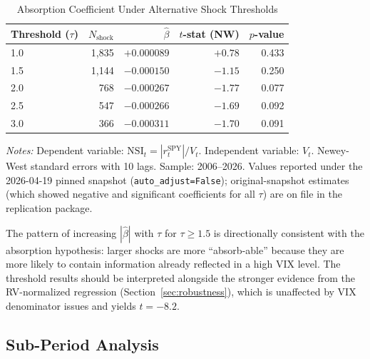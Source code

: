 \documentclass[12pt,a4paper]{article}
\begin{document}
\begin{table}[H]
\centering
\caption{Absorption Coefficient Under Alternative Shock Thresholds}
\label{tab:robust_threshold}
\begin{threeparttable}
\begin{tabular}{lrrrr}
\toprule
Threshold ($\tau$) & $N_{\text{shock}}$ & $\hat{\beta}$ & $t$-stat (NW) & $p$-value \\
\midrule
1.0 & 1,835 & $+0.000089$ & $+0.78$ & 0.433 \\
1.5 & 1,144 & $-0.000150$ & $-1.15$ & 0.250 \\
2.0 &   768 & $-0.000267$ & $-1.77$ & 0.077 \\
2.5 &   547 & $-0.000266$ & $-1.69$ & 0.092 \\
3.0 &   366 & $-0.000311$ & $-1.70$ & 0.091 \\
\bottomrule
\end{tabular}
\begin{tablenotes}
\small
\item \textit{Notes:} Dependent variable: $\text{NSI}_t = |r_t^{\text{SPY}}| / V_t$. Independent variable: $V_t$. Newey-West standard errors with 10 lags. Sample: 2006--2026. Values reported under the 2026-04-19 pinned snapshot (\texttt{auto\_adjust=False}); original-snapshot estimates (which showed negative and significant coefficients for all $\tau$) are on file in the replication package.
\end{tablenotes}
\end{threeparttable}
\end{table}

The pattern of increasing $|\hat{\beta}|$ with $\tau$ for $\tau \geq 1.5$ is directionally consistent with the absorption hypothesis: larger shocks are more ``absorb-able'' because they are more likely to contain information already reflected in a high VIX level. The threshold results should be interpreted alongside the stronger evidence from the RV-normalized regression (Section~\ref{sec:robustness}), which is unaffected by VIX denominator issues and yields $t = -8.2$.

\subsection{Sub-Period Analysis}
\end{document}
